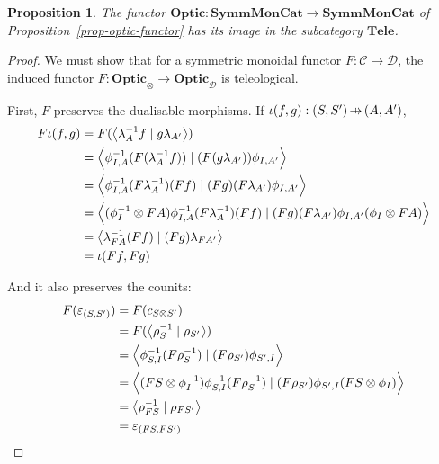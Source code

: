 \documentclass[11pt,a4paper]{article}
\theoremstyle{plain}
\newtheorem{proposition}[theorem]{Proposition}
\theoremstyle{definition}
\newcommand{\C}{\mathscr{C}}
\newcommand{\D}{\mathscr{D}}
\newcommand{\SymmMonCat}{\mathbf{SymmMonCat}}
\newcommand{\Tele}{\mathbf{Tele}}
\newcommand{\Optic}{\mathbf{Optic}}
\newcommand{\rep}[2]{{\ensuremath \left\langle #1 \mid #2 \right\rangle}}
\newcommand{\hto}{\ensuremath{\,\mathaccent\shortmid\rightarrow\,}}
\newcommand{\todo}[1]{\textcolor{red}{\small #1}}
\begin{document}

\begin{proposition}
  The functor $\Optic : \SymmMonCat \to \SymmMonCat$ of Proposition~\ref{prop-optic-functor} has its image in the subcategory $\Tele$.
\end{proposition}
\begin{proof}
  We must show that for a symmetric monoidal functor $F : \C \to \D$, the induced functor $F : \Optic_\otimes \to \Optic_\D$ is teleological.

  First, $F$ preserves the dualisable morphisms. If $\iota(f, g) : (S, S') \hto (A, A')$,
  \begin{align*}
    F\iota(f, g)
    &= F(\rep{\lambda_A^{-1} f}{g \lambda_{A'}}) \\
    &= \rep{\phi^{-1}_{I,A} (F(\lambda_A^{-1} f))}{(F(g \lambda_{A'})) \phi_{I,A'}} \\
    &= \rep{\phi^{-1}_{I,A} (F\lambda_A^{-1}) (Ff)}{(Fg)(F \lambda_{A'}) \phi_{I,A'}} \\
    &= \rep{(\phi^{-1}_I \otimes FA) \phi^{-1}_{I,A} (F\lambda_A^{-1}) (Ff)}{(Fg)(F \lambda_{A'}) \phi_{I,A'} (\phi_I \otimes FA)} \\
    &= \rep{\lambda_{FA}^{-1} (Ff)}{(Fg)\lambda_{FA'}} \\
    &= \iota(Ff, Fg)
  \end{align*}

  And it also preserves the counits:
  \begin{align*}
    F(\varepsilon_{(S, S')})
    &= F(c_{S \otimes S'}) \\
    &= F(\rep{\rho_S^{-1}}{\rho_{S'}}) \\
    &= \rep{\phi^{-1}_{S,I} (F \rho_S^{-1})}{(F \rho_{S'}) \phi_{S',I}} \\
    &= \rep{(FS \otimes \phi_I^{-1}) \phi^{-1}_{S,I} (F \rho_S^{-1})}{(F \rho_{S'}) \phi_{S',I} (FS \otimes \phi_I)} \\
    &= \rep{\rho_{FS}^{-1}}{\rho_{FS'} } \\
    &= \varepsilon_{(FS, FS')}
  \end{align*}

\end{proof}
\end{document}
